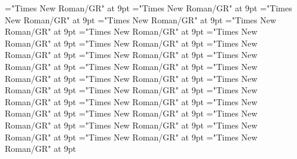 \documentclass[gps1,twoside]{article}
\begin{document}
\font\spanspanowningentrysummarydefinitionvariantformentrybackrefvariantformentrybackrefssensesensessensesensesentrybefore="Times New Roman/GR" at 9pt
\font\spanowningentrysummarydefinitionvariantformentrybackrefvariantformentrybackrefssensesensessensesensesentrylastchildafter="Times New Roman/GR" at 9pt
\font\scientificnamesensesensessensesensesentryafter="Times New Roman/GR" at 9pt
\font\semanticdomainsemanticdomainsemanticdomainssensesensessensesensesentrybefore="Times New Roman/GR" at 9pt
\font\semanticdomainssensesensessensesensesentrybefore="Times New Roman/GR" at 9pt
\font\semanticdomainssensesensessensesensesentryafter="Times New Roman/GR" at 9pt
\font\spanspanabbreviationsemanticdomainsemanticdomainssensesensessensesensesentrybefore="Times New Roman/GR" at 9pt
\font\spanabbreviationsemanticdomainsemanticdomainssensesensessensesensesentrylastchildafter="Times New Roman/GR" at 9pt
\font\spanspannamesemanticdomainsemanticdomainssensesensessensesensesentrybefore="Times New Roman/GR" at 9pt
\font\academicdomainacademicdomainacademicdomainssensesensessensesensesentrybefore="Times New Roman/GR" at 9pt
\font\academicdomainssensesensessensesensesentrybefore="Times New Roman/GR" at 9pt
\font\academicdomainssensesensessensesensesentryafter="Times New Roman/GR" at 9pt
\font\spanspanabbreviationacademicdomainacademicdomainssensesensessensesensesentrybefore="Times New Roman/GR" at 9pt
\font\spanspannameacademicdomainacademicdomainssensesensessensesensesentrybefore="Times New Roman/GR" at 9pt
\font\spannameacademicdomainacademicdomainssensesensessensesensesentryfirstchildbefore="Times New Roman/GR" at 9pt
\font\spannameacademicdomainacademicdomainssensesensessensesensesentrylastchildafter="Times New Roman/GR" at 9pt
\font\usageusageusagessensesensessensesensesentrybefore="Times New Roman/GR" at 9pt
\font\usagessensesensessensesensesentrybefore="Times New Roman/GR" at 9pt
\font\usagessensesensessensesensesentryafter="Times New Roman/GR" at 9pt
\font\spanspanabbreviationusageusagessensesensessensesensesentrybefore="Times New Roman/GR" at 9pt
\font\complexformsnotsubentrycomplexformsnotsubentrycomplexformsnotsubentriessensesensessensesensesentrybefore="Times New Roman/GR" at 9pt
\font\complexformsnotsubentriessensesensessensesensesentryafter="Times New Roman/GR" at 9pt
\font\complexformtypescomplexformsnotsubentrycomplexformsnotsubentriessensesensessensesensesentryafter="Times New Roman/GR" at 9pt
\font\spanspanreverseabbrcomplexformtypecomplexformtypescomplexformsnotsubentrycomplexformsnotsubentriessensesensessensesensesentrybefore="Times New Roman/GR" at 9pt
\font\spanspanheadwordcomplexformsnotsubentrycomplexformsnotsubentriessensesensessensesensesentrybefore="Times New Roman/GR" at 9pt
\end{document}
